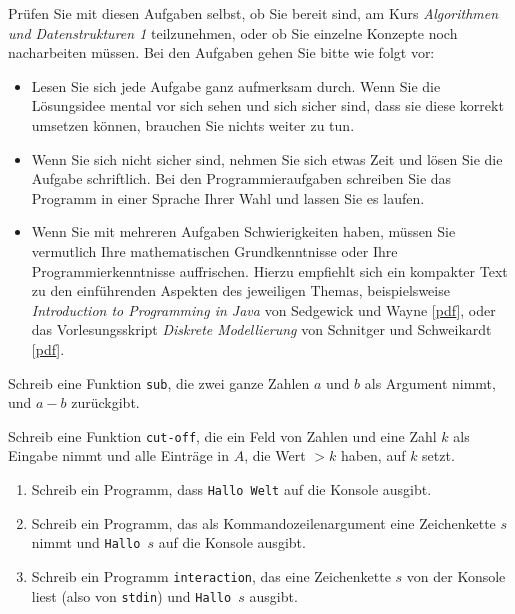 \documentclass{uebung_cs}
\begin{document}
Prüfen Sie mit diesen Aufgaben selbst, ob Sie bereit sind, am Kurs \emph{Algorithmen und Datenstrukturen 1} teilzunehmen, oder ob Sie einzelne Konzepte noch nacharbeiten müssen.
Bei den Aufgaben gehen Sie bitte wie folgt vor:
\begin{itemize}
    \item Lesen Sie sich jede Aufgabe ganz aufmerksam durch. Wenn Sie die Lösungsidee mental vor sich sehen und sich sicher sind, dass sie diese korrekt umsetzen können, brauchen Sie nichts weiter zu tun.
    \item Wenn Sie sich nicht sicher sind, nehmen Sie sich etwas Zeit und lösen Sie die Aufgabe schriftlich. Bei den Programmieraufgaben schreiben Sie das Programm in einer Sprache Ihrer Wahl und lassen Sie es laufen.
    \item Wenn Sie mit mehreren Aufgaben Schwierigkeiten haben, müssen Sie vermutlich Ihre mathematischen Grundkenntnisse oder Ihre Programmierkenntnisse auffrischen. Hierzu empfiehlt sich ein kompakter Text zu den einführenden Aspekten des jeweiligen Themas, beispielsweise \emph{Introduction to Programming in Java} von Sedgewick und Wayne [\href{https://introcs.cs.princeton.edu/java/home/chapter1.pdf}{pdf}], oder das Vorlesungsskript \emph{Diskrete Modellierung} von Schnitger und Schweikardt [\href{http://algo.cs.uni-frankfurt.de/lehre/dismod/material/skript1920.pdf}{pdf}].
\end{itemize}

\begin{aufgabe}[Subtraktion]
    Schreib eine Funktion \texttt{sub}, die zwei ganze Zahlen $a$ und $b$ als Argument nimmt, und $a-b$ zurückgibt.
\end{aufgabe}

\begin{aufgabe}
    Schreib eine Funktion \texttt{cut-off}, die ein Feld von Zahlen und eine Zahl $k$ als Eingabe nimmt und alle Einträge in $A$, die Wert $>k$ haben, auf $k$ setzt.
\end{aufgabe}

\begin{aufgabe}\mbox{}
    \begin{enumerate}
        \item Schreib ein Programm, dass \texttt{Hallo Welt} auf die Konsole ausgibt.
        \item Schreib ein Programm, das als Kommandozeilenargument eine Zeichenkette $s$ nimmt und \texttt{Hallo $s$} auf die Konsole ausgibt.
        \item Schreib ein Programm \texttt{interaction}, das eine Zeichenkette $s$ von der Konsole liest (also von \texttt{stdin}) und \texttt{Hallo $s$} ausgibt.
    \end{enumerate}
\end{aufgabe}
\end{document}

